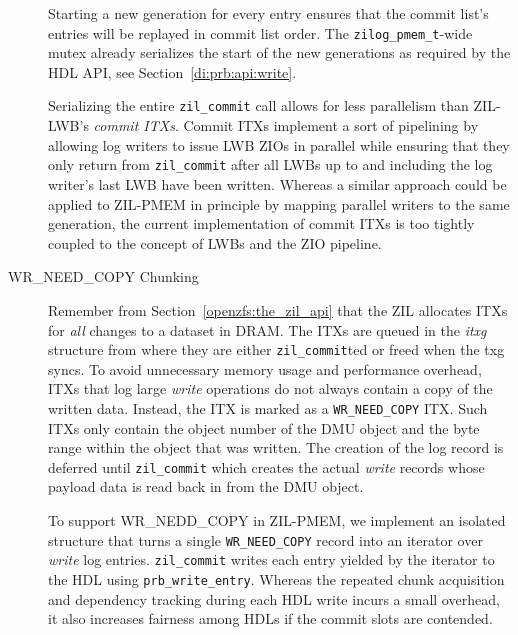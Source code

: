 \documentclass[12pt,a4paper,twoside]{book}
\begin{document}
\begin{description}
        Starting a new generation for every entry ensures that the commit list's entries will be replayed in commit list order.
        The \lstinline{zilog_pmem_t}-wide mutex already serializes the start of the new generations as required by the HDL API, see Section~\ref{di:prb:api:write}.

        Serializing the entire \lstinline{zil_commit} call allows for less parallelism than ZIL-LWB's \textit{commit ITXs}.
        Commit ITXs implement a sort of pipelining by allowing log writers to issue LWB ZIOs in parallel while ensuring that they only return from \lstinline{zil_commit} after all LWBs up to and including the log writer's last LWB have been written.
        Whereas a similar approach could be applied to ZIL-PMEM in principle by mapping parallel writers to the same generation, the current implementation of commit ITXs is too tightly coupled to the concept of LWBs and the ZIO pipeline.

    \item[WR\_NEED\_COPY Chunking]
        Remember from Section~\ref{openzfs:the_zil_api} that the ZIL allocates ITXs for \textit{all} changes to a dataset in DRAM.
        The ITXs are queued in the \textit{itxg} structure from where they are either \lstinline{zil_commit}ted or freed when the txg syncs.
        To avoid unnecessary memory usage and performance overhead, ITXs that log large \textit{write} operations do not always contain a copy of the written data.
        Instead, the ITX is marked as a \lstinline{WR_NEED_COPY} ITX.
        Such ITXs only contain the object number of the DMU object and the byte range within the object that was written.
        The creation of the log record is deferred until \lstinline{zil_commit} which creates the actual \textit{write} records whose payload data is read back in from the DMU object.

        To support WR\_NEDD\_COPY in ZIL-PMEM, we implement an isolated structure that turns a single \lstinline{WR_NEED_COPY} record into an iterator over \textit{write} log entries.
        \lstinline{zil_commit} writes each entry yielded by the iterator to the HDL using \lstinline{prb_write_entry}.
        Whereas the repeated chunk acquisition and dependency tracking during each HDL write incurs a small overhead, it also increases fairness among HDLs if the commit slots are contended.

\end{description}
\end{document}
